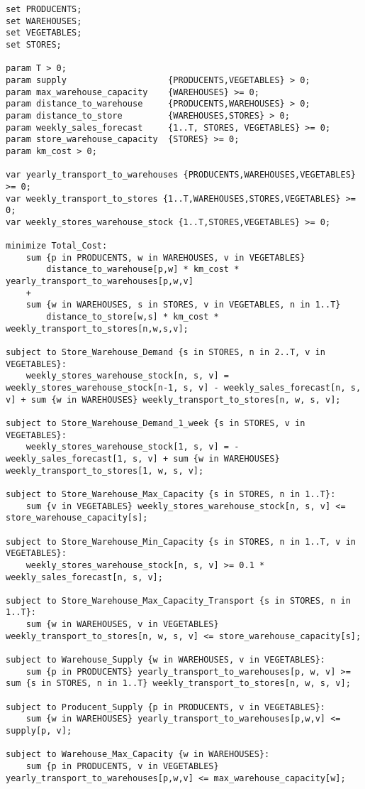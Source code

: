\documentclass{article}
\begin{document}
\begin{lstlisting}
set PRODUCENTS;
set WAREHOUSES;
set VEGETABLES;
set STORES;

param T > 0;
param supply 					{PRODUCENTS,VEGETABLES} > 0;
param max_warehouse_capacity 	{WAREHOUSES} >= 0;
param distance_to_warehouse 	{PRODUCENTS,WAREHOUSES} > 0;
param distance_to_store 		{WAREHOUSES,STORES} > 0;
param weekly_sales_forecast 	{1..T, STORES, VEGETABLES} >= 0;
param store_warehouse_capacity 	{STORES} >= 0;
param km_cost > 0;

var yearly_transport_to_warehouses {PRODUCENTS,WAREHOUSES,VEGETABLES} >= 0;
var weekly_transport_to_stores {1..T,WAREHOUSES,STORES,VEGETABLES} >= 0;
var weekly_stores_warehouse_stock {1..T,STORES,VEGETABLES} >= 0;

minimize Total_Cost:
	sum {p in PRODUCENTS, w in WAREHOUSES, v in VEGETABLES}
   		distance_to_warehouse[p,w] * km_cost * yearly_transport_to_warehouses[p,w,v]
	+
	sum {w in WAREHOUSES, s in STORES, v in VEGETABLES, n in 1..T}
   		distance_to_store[w,s] * km_cost *  weekly_transport_to_stores[n,w,s,v];
    
subject to Store_Warehouse_Demand {s in STORES, n in 2..T, v in VEGETABLES}:
	weekly_stores_warehouse_stock[n, s, v] = weekly_stores_warehouse_stock[n-1, s, v] - weekly_sales_forecast[n, s, v] + sum {w in WAREHOUSES} weekly_transport_to_stores[n, w, s, v];
	
subject to Store_Warehouse_Demand_1_week {s in STORES, v in VEGETABLES}:
	weekly_stores_warehouse_stock[1, s, v] = - weekly_sales_forecast[1, s, v] + sum {w in WAREHOUSES} weekly_transport_to_stores[1, w, s, v];

subject to Store_Warehouse_Max_Capacity {s in STORES, n in 1..T}:
	sum {v in VEGETABLES} weekly_stores_warehouse_stock[n, s, v] <= store_warehouse_capacity[s];
	
subject to Store_Warehouse_Min_Capacity {s in STORES, n in 1..T, v in VEGETABLES}:
	weekly_stores_warehouse_stock[n, s, v] >= 0.1 * weekly_sales_forecast[n, s, v];
	
subject to Store_Warehouse_Max_Capacity_Transport {s in STORES, n in 1..T}:
	sum {w in WAREHOUSES, v in VEGETABLES} weekly_transport_to_stores[n, w, s, v] <= store_warehouse_capacity[s];
	
subject to Warehouse_Supply {w in WAREHOUSES, v in VEGETABLES}:
	sum {p in PRODUCENTS} yearly_transport_to_warehouses[p, w, v] >= sum {s in STORES, n in 1..T} weekly_transport_to_stores[n, w, s, v];

subject to Producent_Supply {p in PRODUCENTS, v in VEGETABLES}:
	sum {w in WAREHOUSES} yearly_transport_to_warehouses[p,w,v] <= supply[p, v];

subject to Warehouse_Max_Capacity {w in WAREHOUSES}:
	sum {p in PRODUCENTS, v in VEGETABLES} yearly_transport_to_warehouses[p,w,v] <= max_warehouse_capacity[w];
\end{lstlisting}
\end{document}
